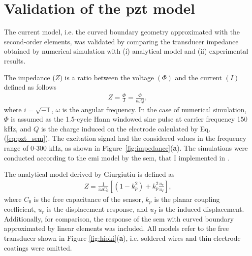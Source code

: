\section{Validation of the \acl{pzt} model}
\label{sec:pztVal}

The current model, i.e. the curved boundary geometry approximated with the second-order elements, was validated by comparing the transducer impedance obtained by numerical simulation with (i) analytical model and (ii) experimental results.

The impedance (\(Z\)) is a ratio between the voltage \((\Phi)\) and the current \((I)\) defined as follows
\begin{eqnarray}
	Z = \frac{\Phi}{I} = \frac{\Phi}{i\omega Q},
	\label{eq:impedance}
\end{eqnarray}
%
%
%
%
where \(i=\sqrt{-1}\), \(\omega\) is the angular frequency.
In the case of numerical simulation, \(\Phi\) is assumed as the 1.5-cycle Hann windowed sine pulse at carrier frequency 150 \unit{\kHz}, and \(Q\) is the charge induced on the electrode calculated by Eq. (\ref{eq:pzt_sem}).
The excitation signal had the considered values in the frequency range of 0-300 \unit{\kHz}, as shown in Figure~\ref{fig:impedance}(\textbf{a}).
The simulations were conducted according to the \ac{emi} model by the \ac{sem}, that I implemented in \cite{fiborek2018time}.

The analytical model derived by Giurgiutiu \cite{giurgiutiu2009micromechatronics} is defined as
\begin{eqnarray}
	Z = \frac{1}{i\omega C_0}\left[\left(1-k_p^2\right)+k_p^2\frac{u_r}{u_I}\right],
\end{eqnarray}
%
%
where \(C_0\) is the free capacitance of the sensor, \(k_p\) is the planar coupling coefficient, \(u_r\) is the displacement response, and \(u_I\) is the induced displacement.
Additionally, for comparison, the response of the \ac{sem} with curved boundary approximated by linear elements was included.
All models refer to the free transducer shown in Figure \ref{fig:hioki}(\textbf{a}), i.e. soldered wires and thin electrode coatings were omitted.

